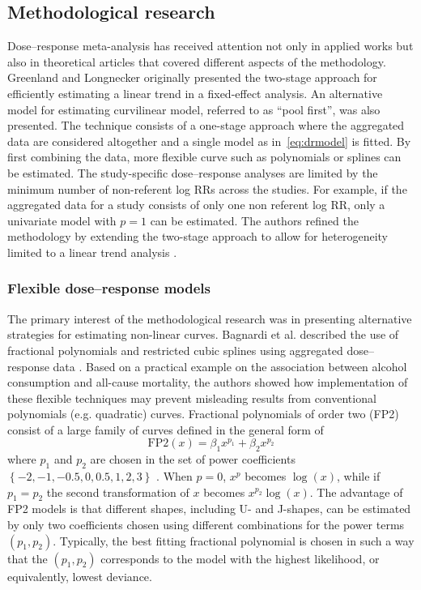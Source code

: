 \documentclass[11pt,a4paper,twoside,openany]{book}\usepackage{knitr}
\begin{document}
{\subsection{Methodological research}

Dose--response meta-analysis has received attention not only in applied works but also in theoretical articles that covered different aspects of the methodology. 
\noindent Greenland and Longnecker originally presented the two-stage approach for efficiently estimating a linear trend in a fixed-effect analysis. An alternative model for estimating curvilinear model, referred to as ``pool first'', was also presented. The technique consists of a one-stage approach where the aggregated data are considered altogether and a single model as in~\ref{eq:drmodel} is fitted. By first combining the data, more flexible curve such as polynomials or splines can be estimated. The study-specific dose--response analyses are limited by the minimum number of non-referent log RRs across the studies. For example, if the aggregated data for a study consists of only one non referent log RR, only a univariate model with $p = 1$ can be estimated. The authors refined the methodology by extending the two-stage approach to allow for heterogeneity limited to a linear trend analysis \citep{berlin1993meta}. 

\subsubsection*{Flexible dose--response models}

The primary interest of the methodological research was in presenting alternative strategies for estimating non-linear curves. Bagnardi et al. described the use of fractional polynomials and restricted cubic splines using aggregated dose--response data \citep{bagnardi2004flexible}. Based on a practical example on the association between alcohol consumption and all-cause mortality, the authors showed how implementation of these flexible techniques may prevent misleading results from conventional polynomials (e.g. quadratic) curves. 
Fractional polynomials of order two (FP2) consist of a large family of curves defined in the general form of
\begin{equation}
\mathrm{FP2}(x) = \beta_1 x^{p_1} + \beta_2x^{p_2}
\label{eq:fracpol}
\end{equation}
\noindent where $p_1$ and $p_2$ are chosen in the set of power coefficients $\left\{-2, -1, -0.5, 0, 0.5, 1, 2, 3 \right\}$ \citep{royston1994regression}. When $p = 0$, $x^p$ becomes $\log(x)$, while if $p_1 = p_2$ the second transformation of $x$ becomes $x^{p_2}\log(x)$. The advantage of FP2 models is that different shapes, including U- and J-shapes, can be estimated by only two coefficients chosen using different combinations for the power terms $(p_1, p_2)$. Typically, the best fitting fractional polynomial is chosen in such a way that the $(p_1, p_2)$ corresponds to the model with the highest likelihood, or equivalently, lowest deviance. 

}
\end{document}

